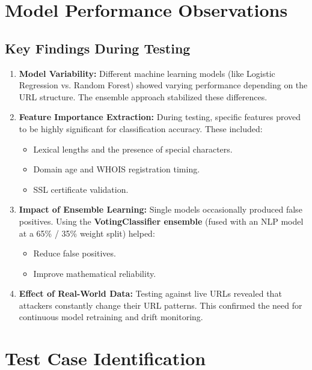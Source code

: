 \section{Model Performance Observations}

\subsection*{Key Findings During Testing}

\begin{enumerate}
    \item \textbf{Model Variability:}
    Different machine learning models (like Logistic Regression vs. Random Forest) showed varying performance depending on the URL structure. The ensemble approach stabilized these differences.

    \item \textbf{Feature Importance Extraction:}
    During testing, specific features proved to be highly significant for classification accuracy. These included:
    \begin{itemize}
        \item Lexical lengths and the presence of special characters.
        \item Domain age and WHOIS registration timing.
        \item SSL certificate validation.
    \end{itemize}

    \item \textbf{Impact of Ensemble Learning:}
    Single models occasionally produced false positives. Using the \textbf{VotingClassifier ensemble} (fused with an NLP model at a 65\% / 35\% weight split) helped:
    \begin{itemize}
        \item Reduce false positives.
        \item Improve mathematical reliability.
    \end{itemize}

    \item \textbf{Effect of Real-World Data:}
    Testing against live URLs revealed that attackers constantly change their URL patterns. This confirmed the need for continuous model retraining and drift monitoring.
\end{enumerate}

\section{Test Case Identification}

